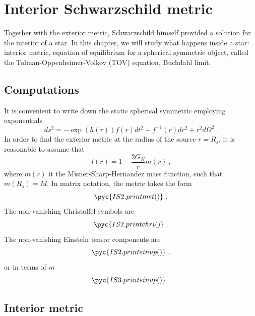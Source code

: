 \chapter{Interior Schwarzschild metric}

    Together with the exterior metric, Schwarzschild himself provided a solution for the interior of a star. In this chapter, we will study what happens inside a star: interior metric, equation of equilibrium for a spherical symmetric object, called the Tolman-Oppenheimer-Volkov (TOV) equation, Buchdahl limit.

\section{Computations}

    It is convenient to write down the static spherical symmetric employing exponentials 
    \begin{equation*}
        ds^2 = - \exp(h(r)) f(r) dt^2 + f^{-1}(r) dr^2 + r^2 d\Omega^2 ~.
    \end{equation*}
    In order to find the exterior metric at the radius of the source $r = R_s$, it is reasonable to assume that 
    \begin{equation*}
        f(r) = 1 - \frac{2 G_N}{r} m(r) ~,
    \end{equation*}
    where $m(r)$ it the Misner-Sharp-Hernandez mass function, such that $m(R_s) = M$. 
    In matrix notation, the metric takes the form 
    \begin{equation*}
        \pyc{IS2.printmet()} ~.
    \end{equation*}
    The non-vanishing Christoffel symbols are 
    \begin{equation*}
        \pyc{IS2.printchri()} ~.
    \end{equation*}
    The non-vanishing Einstein tensor components are 
    \begin{equation*}
        \pyc{IS2.printeinup()} ~,
    \end{equation*}
    or in terms of $m$
    \begin{equation*}
        \pyc{IS3.printeinup()} ~.
    \end{equation*}

\section{Interior metric}

